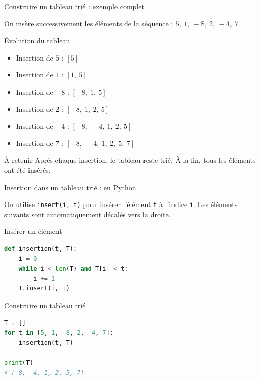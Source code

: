 \documentclass[10pt]{beamer}
\begin{document}
\begin{frame}{Construire un tableau trié : exemple complet}

On insère successivement les éléments de la séquence :
$5,\ 1,\ -8,\ 2,\ -4,\ 7$.

\small
\begin{exampleblock}{Évolution du tableau}
\begin{itemize}
    \item Insertion de $5$ : \quad $[5]$
    \pause
    \item Insertion de $1$ : \quad $[1,\ 5]$
    \pause
    \item Insertion de $-8$ : \quad $[-8,\ 1,\ 5]$
    \pause
    \item Insertion de $2$ : \quad $[-8,\ 1,\ 2,\ 5]$
    \pause
    \item Insertion de $-4$ : \quad $[-8,\ -4,\ 1,\ 2,\ 5]$
    \pause
    \item Insertion de $7$ : \quad $[-8,\ -4,\ 1,\ 2,\ 5,\ 7]$
\end{itemize}
\end{exampleblock}

\pause

\begin{alertblock}{À retenir}
Après chaque insertion, le tableau reste trié.
À la fin, tous les éléments ont été insérés.
\end{alertblock}

\end{frame}
\begin{frame}[fragile]{Insertion dans un tableau trié : en Python}

On utilise \texttt{insert(i, t)} pour insérer l'élément
\texttt{t} à l'indice \texttt{i}. Les éléments suivants
sont automatiquement décalés vers la droite.

\begin{exampleblock}{Insérer un élément}
\begin{lstlisting}[language=Python]
def insertion(t, T):
    i = 0
    while i < len(T) and T[i] < t:
        i += 1
    T.insert(i, t)
\end{lstlisting}
\end{exampleblock}

\pause

\begin{exampleblock}{Construire un tableau trié}
\begin{lstlisting}[language=Python]
T = []
for t in [5, 1, -8, 2, -4, 7]:
    insertion(t, T)

print(T)
# [-8, -4, 1, 2, 5, 7]
\end{lstlisting}
\end{exampleblock}

\end{frame}
\end{document}
